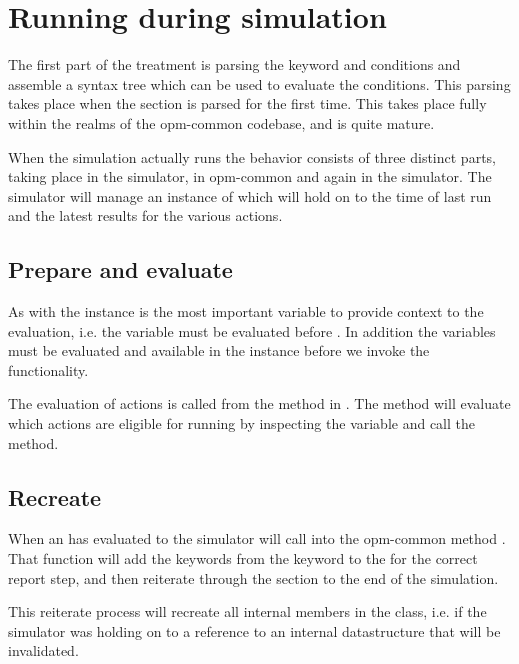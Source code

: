 \section{Running \actionx{} during simulation}
The first part of the \actionx{} treatment is parsing the keyword and conditions
and assemble a syntax tree which can be used to evaluate the conditions. This
parsing takes place when the  section is parsed for the first time.
This takes place fully within the realms of the opm-common codebase, and is
quite mature.

When the simulation actually runs the \actionx{} behavior consists of three
distinct parts, taking place in the simulator, in opm-common and again in the
simulator. The simulator will manage an instance of 
which will hold on to the time of last run and the latest results for the
various actions.

\subsection{Prepare and evaluate}
As with \udq{} the  instance is the most important
variable to provide context to the \actionx{} evaluation, i.e. the
 variable must be evaluated before \actionx{}. In
addition the \udq{} variables must be evaluated and available in the
 instance before we invoke the \actionx{}
functionality.

The evaluation of actions is called from the method 
in . The method will evaluate which actions are eligible for
running by inspecting the  variable and call the
 method.

\subsection{Recreate }
When an \actionx{} has evaluated to  the simulator will call
into the opm-common method .
That function will add the keywords from the \actionx{} keyword to the
 for the correct report step, and then reiterate
through the  section to the end of the simulation.

This reiterate process will recreate all internal members in the
 class, i.e. if the simulator was holding on to a reference
to an internal  datastructure that will be invalidated.

